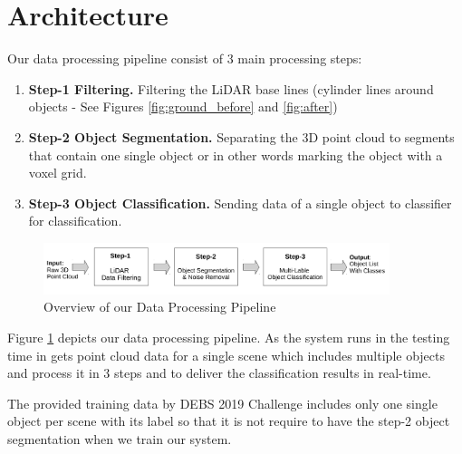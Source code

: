 \section{Architecture}\label{sec:Architecture}

Our data processing pipeline consist of 3 main processing steps: 

\begin{enumerate}
  \item \textbf{Step-1  Filtering. } Filtering the LiDAR base lines (cylinder lines around objects - See Figures \ref{fig:ground_before} and \ref{fig:after})
  \item \textbf{Step-2 Object Segmentation.} Separating the 3D point cloud to segments that contain one single object or in other words marking the object with a voxel grid.  
  \item \textbf{Step-3 Object Classification.}  Sending data of a single object to classifier for classification.  
\end{enumerate}

\begin{figure}[!hb]
 \begin{center}
   \includegraphics[width=0.9\textwidth]{./images/DataProcessingPipleline.pdf}
   \caption{Overview of our Data Processing Pipeline}
   \label{fig:dataPipeline}
 \end{center}
\end{figure}


Figure \ref{fig:dataPipeline} depicts our data processing pipeline. As the system runs in the testing time in gets point cloud data for a single scene which includes multiple objects and process it in 3 steps and to deliver the classification results in real-time.   

The provided training data by DEBS 2019 Challenge \cite{DEBSGC2019} includes only one single object per scene with its label so that it is not require to have the step-2 object segmentation when we train our system.






% 
% 
% 




